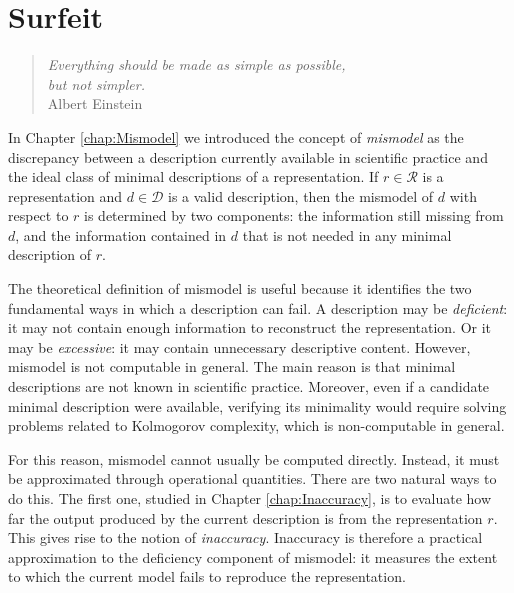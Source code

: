 %
%


\chapter{Surfeit}
\label{chap:Surfeit}

\begin{quote}
\begin{flushright}
\emph{Everything should be made as simple as possible,\\
but not simpler.}\\
Albert Einstein 
\end{flushright}
\end{quote}
\bigskip


In Chapter \ref{chap:Mismodel} we introduced the concept of \emph{mismodel} as the discrepancy between a description currently available in scientific practice and the ideal class of minimal descriptions of a representation. If $r\in\mathcal R$ is a representation and $d\in\mathcal D$ is a valid description, then the mismodel of $d$ with respect to $r$ is determined by two components: the information still missing from $d$, and the information contained in $d$ that is not needed in any minimal description of $r$.

The theoretical definition of mismodel is useful because it identifies the two fundamental ways in which a description can fail. A description may be \emph{deficient}: it may not contain enough information to reconstruct the representation. Or it may be \emph{excessive}: it may contain unnecessary descriptive content. However, mismodel is not computable in general. The main reason is that minimal descriptions are not known in scientific practice. Moreover, even if a candidate minimal description were available, verifying its minimality would require solving problems related to Kolmogorov complexity, which is non-computable in general.

For this reason, mismodel cannot usually be computed directly. Instead, it must be approximated through operational quantities. There are two natural ways to do this. The first one, studied in Chapter \ref{chap:Inaccuracy}, is to evaluate how far the output produced by the current description is from the representation $r$. This gives rise to the notion of \emph{inaccuracy}. Inaccuracy is therefore a practical approximation to the deficiency component of mismodel: it measures the extent to which the current model fails to reproduce the representation.

